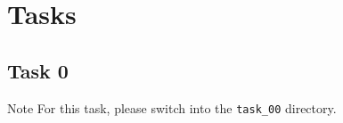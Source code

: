 \section{Tasks}
\subsection{Task 0}

\begin{tip}{Note}
For this task, please switch into the \texttt{task\_00} directory.
\end{tip}

\blindtext{}
